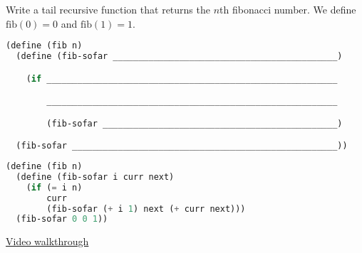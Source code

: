 \question
Write a tail recursive function that returns the $n$th fibonacci number. We
define $\text{fib}(0) = 0$ and $\text{fib}(1) = 1$.

\begin{lstlisting}[language=Scheme]
(define (fib n)
  (define (fib-sofar ____________________________________________)

    (if _________________________________________________________

        _________________________________________________________

        (fib-sofar ______________________________________________)

  (fib-sofar ____________________________________________________))
\end{lstlisting}
\begin{solution}[0in]
\begin{lstlisting}[language=Scheme]
(define (fib n)
  (define (fib-sofar i curr next)
    (if (= i n)
        curr
        (fib-sofar (+ i 1) next (+ curr next)))
  (fib-sofar 0 0 1))
\end{lstlisting}
\href{https://youtu.be/9y7rnuYp-DU}{Video walkthrough}
\end{solution}
